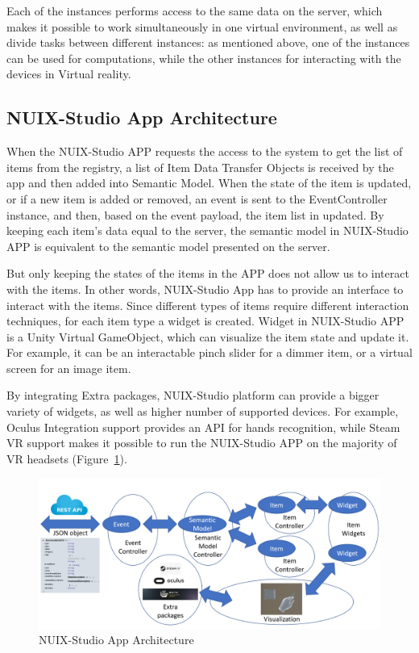 Each of the instances performs access to the same data on the server, which makes it possible to work simultaneously in one virtual environment, as well as divide tasks between different instances: as mentioned above, one of the instances can be used for computations, while the other instances for interacting with the devices in Virtual reality.

\subsection{NUIX-Studio App Architecture}

When the NUIX-Studio APP requests the access to the system to get the list of items from the registry, a list of Item Data Transfer Objects is received by the app and then added into Semantic Model. When the state of the item is updated, or if a new item is added or removed, an event is sent to the EventController instance, and then, based on the event payload, the item list in updated.  By keeping each item’s data equal to the server, the semantic model in NUIX-Studio APP is equivalent to the semantic model presented on the server. 

But only keeping the states of the items in the APP does not allow us to interact with the items. In other words, NUIX-Studio App has to provide an interface to interact with the items. Since different types of items require different interaction techniques, for each item type a widget is created.
Widget in NUIX-Studio APP is a Unity Virtual GameObject, which can visualize the item state and update it. For example, it can be an interactable pinch slider for a dimmer item, or a virtual screen  for an image item.

By integrating Extra packages, NUIX-Studio platform can provide a bigger variety of widgets, as well as higher number of supported devices. For example, Oculus Integration support provides an API for hands recognition, while Steam VR support makes it possible to run the NUIX-Studio APP on the majority of VR headsets (Figure~\ref{fig:AppArchitecture-figure}).

\begin{figure}
  \centering
  \includegraphics[width=0.9\linewidth]{figures/AppArchitecture.png}
  \caption{NUIX-Studio App Architecture}
  \label{fig:AppArchitecture-figure}
\end{figure}

